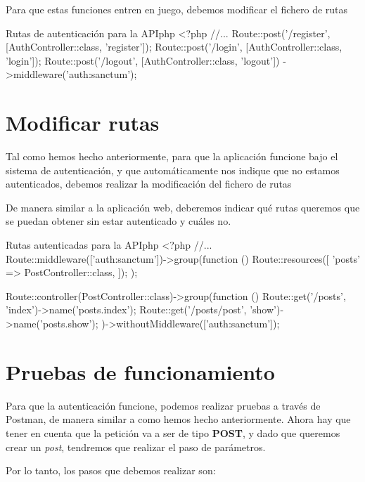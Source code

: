 Para que estas funciones entren en juego, debemos modificar el fichero de rutas 

\begin{mycode}{Rutas de autenticación para la API}{php}{}
<?php
//...
Route::post('/register', [AuthController::class, 'register']);
Route::post('/login', [AuthController::class, 'login']);
Route::post('/logout', [AuthController::class, 'logout'])
    ->middleware('auth:sanctum');
\end{mycode}




\section{Modificar rutas}

Tal como hemos hecho anteriormente, para que la aplicación funcione bajo el sistema de autenticación, y que automáticamente nos indique que no estamos autenticados, debemos realizar la modificación del fichero de rutas 


De manera similar a la aplicación web, deberemos indicar qué rutas queremos que se puedan obtener sin estar autenticado y cuáles no.


\begin{mycode}{Rutas autenticadas para la API}{php}{}
<?php
//...
Route::middleware(['auth:sanctum'])->group(function () {
    Route::resources([
        'posts' => PostController::class,
    ]);
});

Route::controller(PostController::class)->group(function () {
    Route::get('/posts', 'index')->name('posts.index');
    Route::get('/posts/{post}', 'show')->name('posts.show');
})->withoutMiddleware(['auth:sanctum']);
\end{mycode}

\section{Pruebas de funcionamiento}


Para que la autenticación funcione, podemos realizar pruebas a través de Postman, de manera similar a como hemos hecho anteriormente. Ahora hay que tener en cuenta que la petición va a ser de tipo \textbf{POST}, y dado que queremos crear un \textit{post}, tendremos que realizar el paso de parámetros.

Por lo tanto, los pasos que debemos realizar son:

